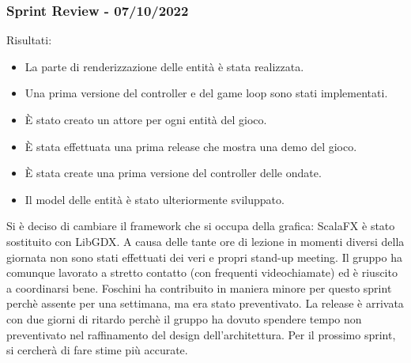 \subsubsection{Sprint Review - 07/10/2022}
Risultati:
\begin{itemize}
  \item La parte di renderizzazione delle entità è stata realizzata.
  \item Una prima versione del controller e del game loop sono stati implementati.
  \item È stato creato un attore per ogni entità del gioco.
  \item È stata effettuata una prima release che mostra una demo del gioco.
  \item È stata create una prima versione del controller delle ondate.
  \item Il model delle entità è stato ulteriormente sviluppato.
\end{itemize}

Si è deciso di cambiare il framework che si occupa della grafica: ScalaFX è stato sostituito con LibGDX.
A causa delle tante ore di lezione in momenti diversi della giornata non sono stati effettuati dei veri e propri stand-up meeting.
Il gruppo ha comunque lavorato a stretto contatto (con frequenti videochiamate) ed è riuscito a coordinarsi bene.
Foschini ha contribuito in maniera minore per questo sprint perchè assente per una settimana, ma era stato preventivato.
La release è arrivata con due giorni di ritardo perchè il gruppo ha dovuto spendere tempo non preventivato nel raffinamento del design dell'architettura.
Per il prossimo sprint, si cercherà di fare stime più accurate.

\newpage